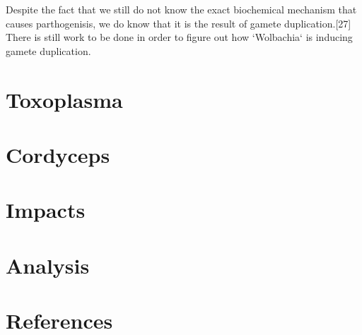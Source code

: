\documentclass[twocolumn]{article}
\begin{document}
Despite the fact that we still do not know the exact biochemical mechanism that causes parthogenisis, we do know that it is the result of gamete duplication.[27] There is still work to be done in order to figure out how `Wolbachia` is inducing gamete duplication.

\section*{Toxoplasma}
\section*{Cordyceps}
\section*{Impacts}
\section*{Analysis}
\section*{References}
\end{document}
